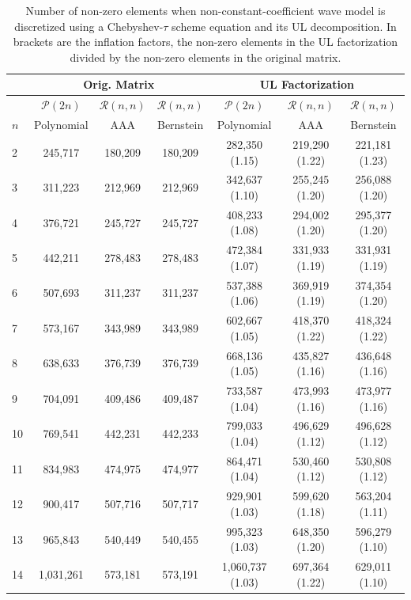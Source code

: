\documentclass{article}
\begin{document}
\begin{table}[]
    \centering
    \caption{Number of non-zero elements when non-constant-coefficient wave model is discretized using a Chebyshev-$\tau$ scheme equation and its UL decomposition. In brackets are the inflation factors, the non-zero elements in the UL factorization divided by the non-zero elements in the original matrix.}
    \label{tab:sparsity_patterns}
    \begin{tabular}{l|ccc|ccc}
\toprule
 & \multicolumn{3}{c|}{Orig. Matrix} & \multicolumn{3}{c}{UL Factorization} \\
 \midrule
 &$\mathcal{P}(2n)$ & $\mathcal{R}(n, n)$ &$\mathcal{R}(n, n)$ &$\mathcal{P}(2n)$ & $\mathcal{R}(n, n)$ &$\mathcal{R}(n, n)$ \\
 $n$& Polynomial & AAA & Bernstein & Polynomial & AAA & Bernstein \\
\midrule
2 & 245,717 & 180,209 & 180,209 & 282,350 (1.15) & 219,290 (1.22) & 221,181 (1.23) \\
3 & 311,223 & 212,969 & 212,969 & 342,637 (1.10) & 255,245 (1.20) & 256,088 (1.20) \\
4 & 376,721 & 245,727 & 245,727 & 408,233 (1.08) & 294,002 (1.20) & 295,377 (1.20) \\
5 & 442,211 & 278,483 & 278,483 & 472,384 (1.07) & 331,933 (1.19) & 331,931 (1.19) \\
6 & 507,693 & 311,237 & 311,237 & 537,388 (1.06) & 369,919 (1.19) & 374,354 (1.20) \\
7 & 573,167 & 343,989 & 343,989 & 602,667 (1.05) & 418,370 (1.22) & 418,324 (1.22) \\
8 & 638,633 & 376,739 & 376,739 & 668,136 (1.05) & 435,827 (1.16) & 436,648 (1.16) \\
9 & 704,091 & 409,486 & 409,487 & 733,587 (1.04) & 473,993 (1.16) & 473,977 (1.16) \\
10 & 769,541 & 442,231 & 442,233 & 799,033 (1.04) & 496,629 (1.12) & 496,628 (1.12) \\
11 & 834,983 & 474,975 & 474,977 & 864,471 (1.04) & 530,460 (1.12) & 530,808 (1.12) \\
12 & 900,417 & 507,716 & 507,717 & 929,901 (1.03) & 599,620 (1.18) & 563,204 (1.11) \\
13 & 965,843 & 540,449 & 540,455 & 995,323 (1.03) & 648,350 (1.20) & 596,279 (1.10) \\
14 & 1,031,261 & 573,181 & 573,191 & 1,060,737 (1.03) & 697,364 (1.22) & 629,011 (1.10) \\
\bottomrule
\end{tabular}
\end{table}
\end{document}
